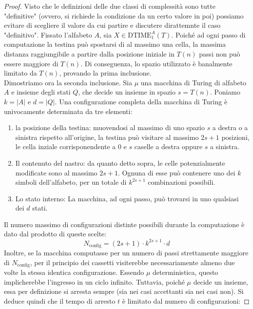\begin{proof}Visto che le definizioni delle
    due classi di complessità sono tutte "definitive"
    (ovvero, si richiede la condizione da un certo valore in poi)
    possiamo evitare di scegliere il valore da cui partire e discutere dirattemnte il caso "definitivo".
    Fissato l'alfabeto $A$, sia $X \in \mathrm{DTIME}_1^A(T)$. Poiché ad ogni passo di computazione la testina può spostarsi di al massimo una cella, la massima distanza raggiungibile a partire dalla posizione iniziale in $T(n)$ passi non può essere maggiore di $T(n)$. Di conseguenza, lo spazio utilizzato è banalmente limitato da $T(n)$, provando la prima inclusione.
    \\
    Dimostriamo ora la seconda inclusione. Sia $\mu$ una macchina di Turing di alfabeto $A$ e insieme degli stati $Q$, che decide un insieme in spazio $s = T(n)$. Poniamo $k = |A|$ e $d = |Q|$.
    Una configurazione completa della macchina di Turing è univocamente determinata da tre elementi:
    \begin{enumerate}
        \item {la posizione della testina:} muovendosi al massimo di uno spazio $s$ a destra o a sinistra rispetto all'origine, 
        la testina può visitare
        al massimo $2s+1$ posizioni, le cella inziale corrisponendente a $0$ e $s$ caselle a destra oppure $s$ a sinistra.
        \item {Il contenuto del nastro:}
        da quanto detto sopra, le celle potenzialmente modificate sono al massimo $2s+1$. 
        Ognuna di esse può contenere uno dei $k$ simboli dell'alfabeto, per un totale di $k^{2s+1}$ combinazioni possibili.
        \item {Lo stato interno:} La macchina, ad ogni passo, può trovarsi in uno qualsiasi dei $d$ stati.
    \end{enumerate}
    Il numero massimo di configurazioni distinte possibili durante la computazione è dato dal prodotto di queste scelte:
    \[
    N_{\text{config}} = (2s+1) \cdot k^{2s+1} \cdot d
    \]
    Inoltre,
    se la macchina computasse per un numero di passi strettamente maggiore di $N_{\text{config}}$, per il principio dei cassetti visiterebbe necessariamente almeno due volte la stessa identica configurazione. 
    Essendo $\mu$ deterministica, questo implicherebbe l'ingresso in un ciclo infinito. 
    Tuttavia, poiché $\mu$ decide un insieme, essa per definizione si arresta sempre
    (sia nei casi accettanti sia nei casi non).
    Si deduce quindi che il tempo di arresto $t$ è limitato dal numero di configurazioni:

\end{proof}
